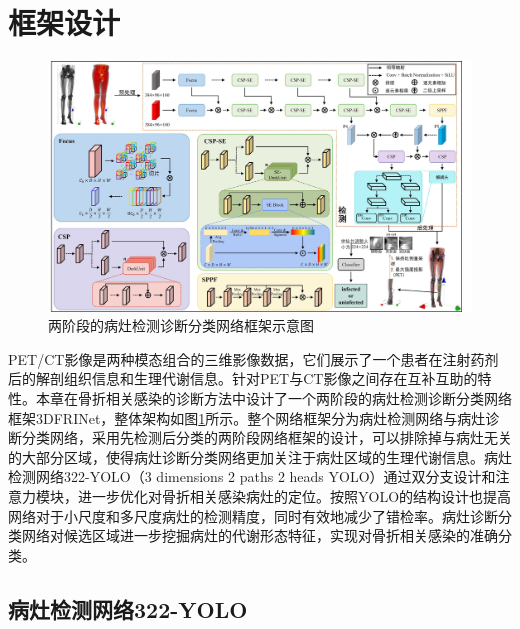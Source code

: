 \section{框架设计}

\begin{figure}
  \centering
  \includegraphics[width=0.95\textheight,height=\textwidth,angle=90,keepaspectratio]{figures/chap04_model.jpg}
  \caption{两阶段的病灶检测诊断分类网络框架示意图}
  \label{fig:chap04_model}
\end{figure}

PET/CT影像是两种模态组合的三维影像数据，它们展示了一个患者在注射药剂后的解剖组织信息和生理代谢信息。针对PET与CT影像之间存在互补互助的特性。本章在骨折相关感染的诊断方法中设计了一个两阶段的病灶检测诊断分类网络框架3DFRINet，整体架构如图\ref{fig:chap04_model}所示。整个网络框架分为病灶检测网络与病灶诊断分类网络，采用先检测后分类的两阶段网络框架的设计，可以排除掉与病灶无关的大部分区域，使得病灶诊断分类网络更加关注于病灶区域的生理代谢信息。病灶检测网络322-YOLO（3 dimensions 2 paths 2 heads YOLO）通过双分支设计和注意力模块，进一步优化对骨折相关感染病灶的定位。按照YOLO的结构设计也提高网络对于小尺度和多尺度病灶的检测精度，同时有效地减少了错检率。病灶诊断分类网络对候选区域进一步挖掘病灶的代谢形态特征，实现对骨折相关感染的准确分类。

\subsection{病灶检测网络322-YOLO}

